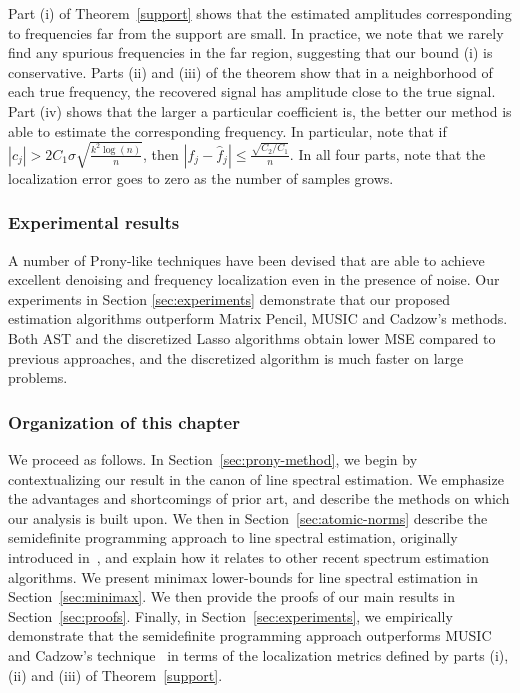 Part (i) of Theorem~\ref{support} shows that the estimated amplitudes
corresponding to frequencies far from the support are small. In practice, we
note that we rarely find any spurious frequencies in the far region, suggesting
that our bound (i) is conservative. Parts (ii) and (iii) of the theorem show
that in a neighborhood of each true frequency, the recovered signal has
amplitude close to the true signal. Part (iv) shows that the larger a particular
coefficient is, the better our method is able to estimate the corresponding
frequency. In particular, note that if $|c_j| > 2 C_1 \sigma \sqrt{\frac{ k^2
\log(n)}{n}}$, then $\left| f_j - \hat{f}_j \right| \leq \frac{\sqrt{C_2/C_1}
}{n}$. In all four parts, note that the localization error goes to zero as the
number of samples grows.

\subsubsection{Experimental results} 

A number of Prony-like techniques have been devised that are able to achieve
excellent denoising and frequency localization even in the presence of noise.
Our experiments in Section \ref{sec:experiments} demonstrate that our proposed
estimation algorithms outperform Matrix Pencil, MUSIC and Cadzow's methods. Both
AST and the discretized Lasso algorithms obtain lower MSE compared to previous
approaches, and the discretized algorithm is much faster on large problems.

\subsubsection{Organization of this chapter}
We proceed as follows. In Section~\ref{sec:prony-method}, we begin by
contextualizing our result in the canon of line spectral estimation. We
emphasize the advantages and shortcomings of prior art, and describe the methods
on which our analysis is built upon. We then in Section~\ref{sec:atomic-norms}
describe the semidefinite programming approach to line spectral estimation,
originally introduced in~\cite{btr12}, and explain how it relates to other
recent spectrum estimation algorithms. We present minimax lower-bounds for line
spectral estimation in Section~\ref{sec:minimax}. We then provide the proofs of
our main results in Section~\ref{sec:proofs}. Finally, in
Section~\ref{sec:experiments}, we empirically demonstrate that the semidefinite
programming approach outperforms MUSIC~\cite{music} and Cadzow's
technique~\cite{cadzow05} in terms of the localization metrics defined by parts
(i), (ii) and (iii) of Theorem~\ref{support}.

